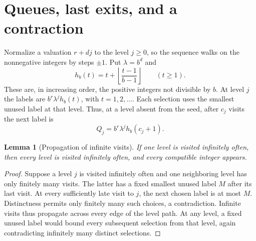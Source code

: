 \documentclass[10pt]{article}
\newtheorem{lemma}{Lemma}
\begin{document}
\section{Queues, last exits, and a contraction}
Normalize a valuation $r+dj$ to the level $j\ge0$, so the sequence walks
on the nonnegative integers by steps $\pm1$. Put $\lambda=b^d$ and
\[
 h_b(t)=t+\left\lfloor\frac{t-1}{b-1}\right\rfloor\qquad(t\ge1).
\]
These are, in increasing order, the positive integers not divisible by $b$.
At level $j$ the labels are $b^r\lambda^j h_b(t)$, with $t=1,2,\ldots$.
Each selection uses the smallest unused label at that level. Thus, at
a level absent from the seed, after $c_j$ visits the next label is
\begin{equation}\label{eq:queue}
 Q_j=b^r\lambda^j h_b(c_j+1).
\end{equation}

\begin{lemma}[Propagation of infinite visits]\label{lem:propagate}
If one level is visited infinitely often, then every level is visited
infinitely often, and every compatible integer appears.
\end{lemma}
\begin{proof}
Suppose a level $j$ is visited infinitely often and one neighboring
level has only finitely many visits. The latter has a fixed smallest
unused label $M$ after its last visit. At every sufficiently late visit
to $j$, the next chosen label is at most $M$. Distinctness permits only
finitely many such choices, a contradiction. Infinite visits thus
propagate across every edge of the level path. At any level, a fixed
unused label would bound every subsequent selection from that level,
again contradicting infinitely many distinct selections.
\end{proof}
\end{document}
